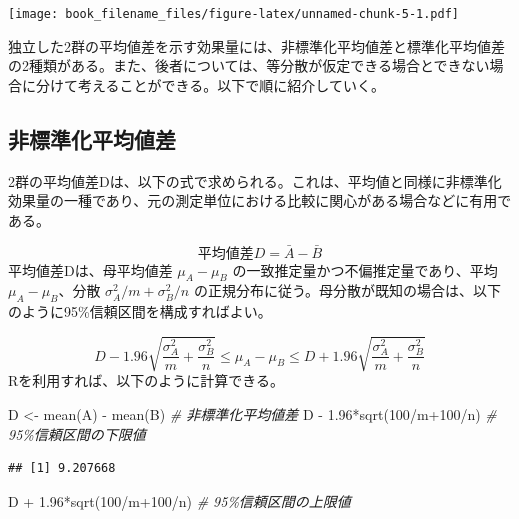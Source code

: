\documentclass[
  ja=standard, xelatex, base=12pt]{bxjsreport}
\newenvironment{Shaded}{\begin{snugshade}}{\end{snugshade}}
\newcommand{\CommentTok}[1]{\textcolor[rgb]{0.56,0.35,0.01}{\textit{#1}}}
\newcommand{\DecValTok}[1]{\textcolor[rgb]{0.00,0.00,0.81}{#1}}
\newcommand{\FloatTok}[1]{\textcolor[rgb]{0.00,0.00,0.81}{#1}}
\newcommand{\FunctionTok}[1]{\textcolor[rgb]{0.00,0.00,0.00}{#1}}
\newcommand{\NormalTok}[1]{#1}
\newcommand{\OtherTok}[1]{\textcolor[rgb]{0.56,0.35,0.01}{#1}}
\newcommand{\SpecialCharTok}[1]{\textcolor[rgb]{0.00,0.00,0.00}{#1}}
\begin{document}
\texttt{[image: book\_filename\_files/figure-latex/unnamed-chunk-5-1.pdf]}

独立した2群の平均値差を示す効果量には、非標準化平均値差と標準化平均値差の2種類がある。また、後者については、等分散が仮定できる場合とできない場合に分けて考えることができる。以下で順に紹介していく。

\hypertarget{ux975eux6a19ux6e96ux5316ux5e73ux5747ux5024ux5dee}{%
\subsection{非標準化平均値差}\label{ux975eux6a19ux6e96ux5316ux5e73ux5747ux5024ux5dee}}

2群の平均値差Dは、以下の式で求められる。これは、平均値と同様に非標準化効果量の一種であり、元の測定単位における比較に関心がある場合などに有用である。

\[
平均値差D=\bar{A}-\bar{B}
\] 平均値差Dは、母平均値差 \(\mu_A-\mu_B\) の一致推定量かつ不偏推定量であり、平均\(\mu_A-\mu_B\)、分散 \(\sigma_A^2/m+\sigma_B^2/n\) の正規分布に従う。母分散が既知の場合は、以下のように95\%信頼区間を構成すればよい。

\[
D-1.96\sqrt{\frac{\sigma_A^2}{m}+\frac{\sigma_B^2}{n}}\leq\mu_A-\mu_B\leq D+1.96\sqrt{\frac{\sigma_A^2}{m}+\frac{\sigma_B^2}{n}}
\] Rを利用すれば、以下のように計算できる。

\begin{Shaded}
\begin{Highlighting}[]
\NormalTok{D }\OtherTok{\textless{}{-}} \FunctionTok{mean}\NormalTok{(A) }\SpecialCharTok{{-}} \FunctionTok{mean}\NormalTok{(B)     }\CommentTok{\# 非標準化平均値差}
\NormalTok{D }\SpecialCharTok{{-}} \FloatTok{1.96}\SpecialCharTok{*}\FunctionTok{sqrt}\NormalTok{(}\DecValTok{100}\SpecialCharTok{/}\NormalTok{m}\SpecialCharTok{+}\DecValTok{100}\SpecialCharTok{/}\NormalTok{n) }\CommentTok{\# 95\%信頼区間の下限値}
\end{Highlighting}
\end{Shaded}

\begin{verbatim}
## [1] 9.207668
\end{verbatim}

\begin{Shaded}
\begin{Highlighting}[]
\NormalTok{D }\SpecialCharTok{+} \FloatTok{1.96}\SpecialCharTok{*}\FunctionTok{sqrt}\NormalTok{(}\DecValTok{100}\SpecialCharTok{/}\NormalTok{m}\SpecialCharTok{+}\DecValTok{100}\SpecialCharTok{/}\NormalTok{n) }\CommentTok{\# 95\%信頼区間の上限値}
\end{Highlighting}
\end{Shaded}
\end{document}
